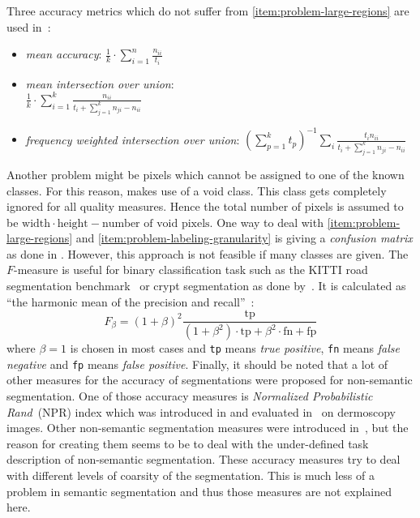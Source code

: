 \documentclass[technote,a4paper,leqno]{IEEEtran}
\begin{document}
\goodbreak
Three accuracy metrics which do not suffer from
\cref{item:problem-large-regions} are used in~\cite{long2014fully}:\nobreak%
\begin{itemize}
    \item \textit{mean accuracy}: $\frac{1}{k} \cdot \sum_{i=1}^n \frac{n_{ii}}{t_i}$
    \item \textit{mean intersection over union}: \hfill\\$\frac{1}{k} \cdot \sum_{i=1}^k \frac{n_{ii}}{t_i + \sum_{j=1}^k n_{ji}-n_{ii}}$
    \item \textit{frequency weighted intersection over union}:
          ${({\sum_{p=1}^k t_p})}^{-1} \sum_i \frac{t_i n_{ii}}{t_i + \sum_{j=1}^k n_{ji} - n_{ii}}$
\end{itemize}
Another problem might be pixels which cannot be assigned to one of the known
classes. For this reason, \cite{shotton2006textonboost} makes use of a void
class. This class gets completely ignored for all quality measures. Hence the
total number of pixels is assumed to be $\text{width} \cdot \text{height} - \text{number of void pixels}$.
One way to deal with \cref{item:problem-large-regions} and
\cref{item:problem-labeling-granularity} is giving a \textit{confusion matrix}
as done in \cite{shotton2006textonboost}. However, this approach is not
feasible if many classes are given.
The $F$-measure is useful for binary classification task such as the KITTI road
segmentation benchmark~\cite{Fritsch2013ITSC} or crypt segmentation as done
by~\cite{cohen2015memory}. It is calculated as \enquote{the harmonic mean of
the precision and recall}~\cite{pantofaru2005comparison}:
\[F_\beta = (1+\beta)^2 \frac{\text{tp}}{(1+\beta^2)\cdot \text{tp}+ \beta^2 \cdot \text{fn} + \text{fp}}\]
where $\beta=1$ is chosen in most cases and \texttt{tp} means \textit{true
positive}, \texttt{fn} means \textit{false negative} and  \texttt{fp} means
\textit{false positive}.
Finally, it should be noted that a lot of other measures for the accuracy of
segmentations were proposed for non-semantic segmentation. One of those
accuracy measures is \textit{Normalized Probabilistic Rand}~(NPR) index which
was introduced in \cite{unnikrishnan2005measure} and evaluated
in~\cite{celebi2009improved} on dermoscopy images. Other non-semantic
segmentation measures were introduced in~\cite{martin2001database}, but the
reason for creating them seems to be to deal with the under-defined task
description of non-semantic segmentation. These accuracy measures try to deal
with different levels of coarsity of the segmentation. This is much less of a
problem in semantic segmentation and thus those measures are not explained
here.
\end{document}
